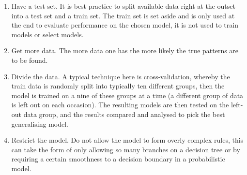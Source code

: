 \begin{enumerate}

\item{Have a test set.} It is best practice to split available data right at the outset into a test set and a train set. The train set is set aside and is only used at the end to evaluate performance on the chosen model, it is not used to train models or select models.

\item{Get more data.} The more data one has the more likely the true patterns are to be found.

\item{Divide the data.} A typical technique here is cross-validation, whereby the train data is randomly split into typically ten different groups, then the model is trained on a nine of these groups at a time (a different group of data is left out on each occasion). The resulting models are then tested on the left-out data group, and the results compared and analysed to pick the best generalising model.

\item{Restrict the model.} Do not allow the model to form overly complex rules, this can take the form of only allowing so many branches on a decision tree or by requiring a certain smoothness to a decision boundary in a probabilistic model. 

\end{enumerate} 


